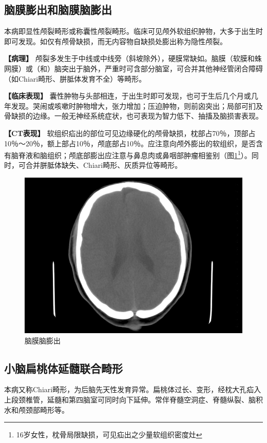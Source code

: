 \subsection{脑膜膨出和脑膜脑膨出}

本病即显性颅裂畸形或称囊性颅裂畸形。临床可见颅外软组织肿物，大多于出生时即可发现。如仅有颅骨缺损，而无内容物自缺损处膨出称为隐性颅裂。

\textbf{【病理】}
颅裂多发生于中线或中线旁（斜坡除外），硬膜常缺如。脑膜（软膜和蛛网膜）或（和）脑突出于脑外，严重时可含部分脑室，可合并其他神经管闭合障碍（如Chiari畸形、胼胝体发育不全）等畸形。

\textbf{【临床表现】}
囊性肿物与头部相连，于出生时即可发现，也可于生后几个月或几年发现。哭闹或咳嗽时肿物增大，张力增加；压迫肿物，则前囟突出；局部可扪及骨缺损的边缘。一般无神经系统症状，也可表现为智力低下、抽搐及脑损害表现。

\textbf{【CT表现】}
软组织疝出的部位可见边缘硬化的颅骨缺损，枕部占70％，顶部占10％～20％，额上部占10％，颅底部占10％。应注意向颅外膨出的软组织，是否含有脑脊液和脑组织；颅底部膨出应注意与鼻息肉或鼻咽部肿瘤相鉴别（图\ref{fig2-5}\footnote{16岁女性，枕骨局限缺损，可见疝出之少量软组织密度灶}）。同时，可合并胼胝体缺失、Chiari畸形、灰质异位等畸形。

\begin{figure}[!htbp]
 \centering
 \includegraphics[width=.7\textwidth,height=\textheight,keepaspectratio]{./images/Image00020.jpg}
 \captionsetup{justification=centering}
 \caption{脑膜脑膨出}
 \label{fig2-5}
  \end{figure} 

\subsection{小脑扁桃体延髓联合畸形}

本病又称Chiari畸形，为后脑先天性发育异常。扁桃体过长、变形，经枕大孔疝入上段颈椎管，延髓和第四脑室可同时向下延伸。常伴脊髓空洞症、脊髓纵裂、脑积水和颅颈部畸形等。

